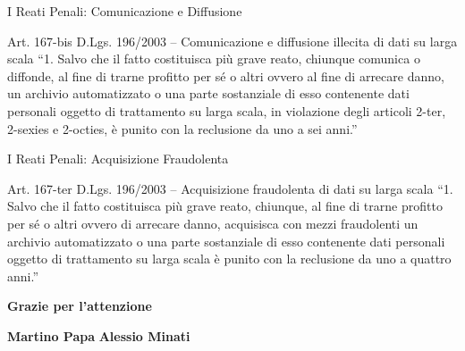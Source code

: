 \documentclass[aspectratio=169]{beamer}
\begin{document}
\begin{frame}{I Reati Penali: Comunicazione e Diffusione}
  \begin{block}{Art. 167-bis D.Lgs. 196/2003 -- Comunicazione e diffusione illecita di dati su larga scala}
    \small
    ``1. Salvo che il fatto costituisca più grave reato, chiunque comunica o diffonde, al fine di trarne profitto per sé o altri ovvero al fine di arrecare danno, un archivio automatizzato o una parte sostanziale di esso contenente dati personali oggetto di trattamento su larga scala, in violazione degli articoli 2-ter, 2-sexies e 2-octies, è punito con la reclusione da uno a sei anni.''
  \end{block}
\end{frame}

\begin{frame}{I Reati Penali: Acquisizione Fraudolenta}
  \begin{block}{Art. 167-ter D.Lgs. 196/2003 -- Acquisizione fraudolenta di dati su larga scala}
    \small
    ``1. Salvo che il fatto costituisca più grave reato, chiunque, al fine di trarne profitto per sé o altri ovvero di arrecare danno, acquisisca con mezzi fraudolenti un archivio automatizzato o una parte sostanziale di esso contenente dati personali oggetto di trattamento su larga scala è punito con la reclusione da uno a quattro anni.''
  \end{block}
\end{frame}

\begin{frame}
  \begin{center}
    \Huge \textcolor{legaleblue}{\textbf{Grazie per l'attenzione}}
    
    \vspace{1cm}
    \large \textbf{Martino Papa} \quad \textbf{Alessio Minati}
  \end{center}
\end{frame}
\end{document}
